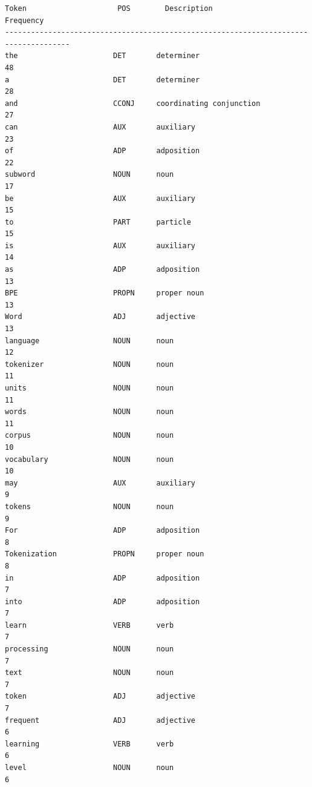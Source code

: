 \documentclass[12pt,a4paper,oneside]{report}
\begin{document}
\begin{Verbatim}[commandchars=\\\{\},breaklines=true,breakanywhere=true,fontsize=\scriptsize,frame=leftline,framesep=2mm,rulecolor=\color{gray}]
Token                     POS        Description                         Frequency
-------------------------------------------------------------------------------------
the                      DET       determiner                         48
a                        DET       determiner                         28
and                      CCONJ     coordinating conjunction           27
can                      AUX       auxiliary                          23
of                       ADP       adposition                         22
subword                  NOUN      noun                               17
be                       AUX       auxiliary                          15
to                       PART      particle                           15
is                       AUX       auxiliary                          14
as                       ADP       adposition                         13
BPE                      PROPN     proper noun                        13
Word                     ADJ       adjective                          13
language                 NOUN      noun                               12
tokenizer                NOUN      noun                               11
units                    NOUN      noun                               11
words                    NOUN      noun                               11
corpus                   NOUN      noun                               10
vocabulary               NOUN      noun                               10
may                      AUX       auxiliary                          9
tokens                   NOUN      noun                               9
For                      ADP       adposition                         8
Tokenization             PROPN     proper noun                        8
in                       ADP       adposition                         7
into                     ADP       adposition                         7
learn                    VERB      verb                               7
processing               NOUN      noun                               7
text                     NOUN      noun                               7
token                    ADJ       adjective                          7
frequent                 ADJ       adjective                          6
learning                 VERB      verb                               6
level                    NOUN      noun                               6

\end{Verbatim}
\end{document}

